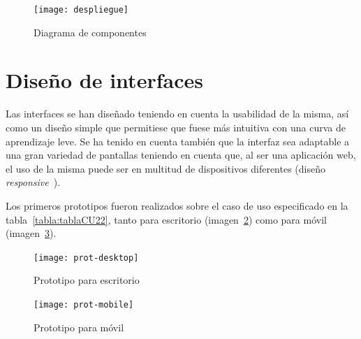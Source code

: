 \begin{figure}
	\centering
	\texttt{[image: despliegue]}
	\caption{Diagrama de componentes}
	\label{fig:despl}
\end{figure}

\section{Diseño de interfaces}

Las interfaces se han diseñado teniendo en cuenta la usabilidad de la misma, así como un diseño simple que permitiese que fuese más intuitiva con una curva de aprendizaje leve. Se ha tenido en cuenta también que la interfaz sea adaptable a una gran variedad de pantallas teniendo en cuenta que, al ser una aplicación web, el uso de la misma puede ser en multitud de dispositivos diferentes (diseño \textit{responsive}~\cite{wiki:responsive}).

Los primeros prototipos fueron realizados sobre el caso de uso especificado en la tabla~\ref{tabla:tablaCU22}, tanto para escritorio (imagen~\ref{fig:proto-desk}) como para móvil (imagen~\ref{fig:proto-mob}).

\begin{figure}[h]
	\centering
	\texttt{[image: prot-desktop]}
	\caption{Prototipo para escritorio}
	\label{fig:proto-desk}
\end{figure}

\begin{figure}[h]
	\centering
	\texttt{[image: prot-mobile]}
	\caption{Prototipo para móvil}
	\label{fig:proto-mob}
\end{figure}
